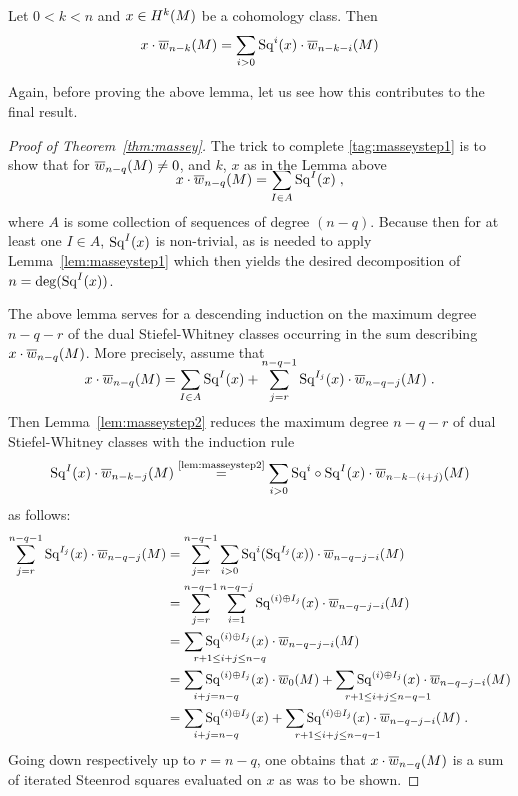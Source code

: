 \begin{Lem}\label{lem:masseystep2}
  Let $0<k<n$ and $x\in H^k(M)$ be a cohomology class.
  Then
  \begin{gather*}
    x\cdot{\overline{w}_{n-k}}(M) = \sum_{i>0}\mathrm{Sq}^{i}(x)\cdot{\overline{w}_{n-k-i}}(M)
  \end{gather*}
\end{Lem}
Again, before proving the above lemma, let us see how this contributes
to the final result.
\begin{proof}[Proof of Theorem~\ref{thm:massey}]
  The trick to complete \ref{tag:masseystep1} is to show that
  for ${\overline{w}_{n-q}}(M)\neq 0$, and $k$, $x$ as in the Lemma above
  \begin{gather*}
    \SwapAboveDisplaySkip
    x\cdot \dualw{n-q}{M} = \sum_{I\in A}\Sq I(x)
    \;,
  \end{gather*}
  where $A$ is some collection of sequences of degree $(n-q)$.
  Because then for at least one $I\in A$, $\mathrm{Sq}^{I}(x)$ is non-trivial,
  as is needed to apply Lemma~\ref{lem:masseystep1} which then yields
  the desired decomposition of $n=\deg(\mathrm{Sq}^{I}(x))$.

  The above lemma serves for a descending induction on the maximum
  degree $n-q-r$ of the dual Stiefel-Whitney classes occurring in
  the sum describing $x\cdot{\overline{w}_{n-q}}(M)$.
  More precisely, assume that
  \begin{gather*}
    \SwapAboveDisplaySkip
    x\cdot \dualw{n-q}{M}
    = \sum_{I\in A}\Sq I(x)
    + \sum_{j=r}^{n-q-1}\Sq{I_j}(x)\cdot\dualw{n-q-j}{M}
    \;.
  \end{gather*}
  Then Lemma~\ref{lem:masseystep2} reduces the maximum degree $n-q-r$
  of dual Stiefel-Whitney classes with the induction rule
  \begin{gather*}
    \mathrm{Sq}^{I}(x)\cdot{\overline{w}_{n-k-j}}(M)
    \overset{\text{\ref{lem:masseystep2}}}=
    \sum_{i>0}\mathrm{Sq}^{i}\circ\mathrm{Sq}^{I}(x)\cdot{\overline{w}_{n-k-(i+j)}}(M)
  \end{gather*}
  as follows:
  \begin{align*}
    \sum_{j=r}^{n-q-1}\Sq{I_j}(x)\cdot\dualw{n-q-j}{M}
    &= \sum_{j=r}^{n-q-1}\sum_{i>0}
      \Sq i(\Sq{I_j}(x))\cdot \dualw{n-q-j-i}{M}
    \\
    &= \sum_{j=r}^{n-q-1}\sum_{i=1}^{n-q-j}
      \Sq{(i)\concat I_j}(x)\cdot \dualw{n-q-j-i}{M}
    \\
    &= \sum_{\mathrlap{r+1\leq i+j\leq n-q}}
      \Sq{(i)\concat I_j}(x)\cdot \dualw{n-q-j-i}{M}
    \\
    &=\sum_{\mathrlap{i+j=n-q}} \Sq{(i)\concat I_j}(x)\cdot \dualw0{M}
      + \sum_{\mathrlap{r+1\leq i+j\leq n-q-1}}
      \Sq{(i)\concat I_j}(x)\cdot \dualw{n-q-j-i}{M}
    \\
    &=\sum_{\mathrlap{i+j=n-q}} \Sq{(i)\concat I_j}(x)
      + \sum_{\mathrlap{r+1\leq i+j\leq n-q-1}}
      \Sq{(i)\concat I_j}(x)\cdot \dualw{n-q-j-i}{M}
      \;.
  \end{align*}
  Going down respectively up to $r=n-q$, one obtains that
  $x\cdot{\overline{w}_{n-q}}(M)$ is a sum of iterated Steenrod squares
  evaluated on $x$ as was to be shown.
\end{proof}

